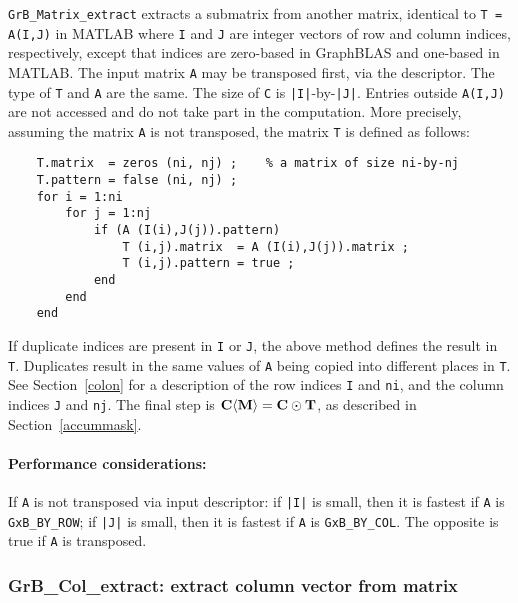 \documentclass[12pt]{article}
\begin{document}
{\verb'GrB_Matrix_extract' extracts a submatrix from another matrix, identical
to \verb'T = A(I,J)' in MATLAB where \verb'I' and \verb'J' are integer vectors
of row and column indices, respectively, except that indices are zero-based in
GraphBLAS and one-based in MATLAB.  The input matrix \verb'A' may be transposed
first, via the descriptor.  The type of \verb'T' and \verb'A' are the same.
The size of \verb'C' is \verb'|I|'-by-\verb'|J|'.
Entries outside \verb'A(I,J)' are not accessed and do not take part in the
computation.  More precisely, assuming the matrix \verb'A' is not transposed,
the matrix \verb'T' is defined as follows:

    \vspace{-0.1in}
    {\footnotesize
    \begin{verbatim}
    T.matrix  = zeros (ni, nj) ;    % a matrix of size ni-by-nj
    T.pattern = false (ni, nj) ;
    for i = 1:ni
        for j = 1:nj
            if (A (I(i),J(j)).pattern)
                T (i,j).matrix  = A (I(i),J(j)).matrix ;
                T (i,j).pattern = true ;
            end
        end
    end \end{verbatim}}

\vspace{-0.1in}
If duplicate indices are present in \verb'I' or \verb'J', the above method
defines the result in \verb'T'.  Duplicates result in the same values of
\verb'A' being copied into different places in \verb'T'.
See Section~\ref{colon} for a description of the row indices
\verb'I' and \verb'ni', and the column indices
\verb'J' and \verb'nj'.
The final step is ${\bf C \langle M \rangle  = C \odot
T}$, as described in Section~\ref{accummask}.

\paragraph{\bf Performance considerations:} %
If \verb'A' is not transposed via input descriptor: if \verb'|I|' is small,
then it is fastest if \verb'A' is \verb'GxB_BY_ROW'; if
\verb'|J|' is small, then it is fastest if \verb'A' is
\verb'GxB_BY_COL'.  The opposite is true if \verb'A' is transposed.

\newpage
\subsubsection{{\sf GrB\_Col\_extract:} extract column vector from matrix}
\label{extract_column}

}
\end{document}
